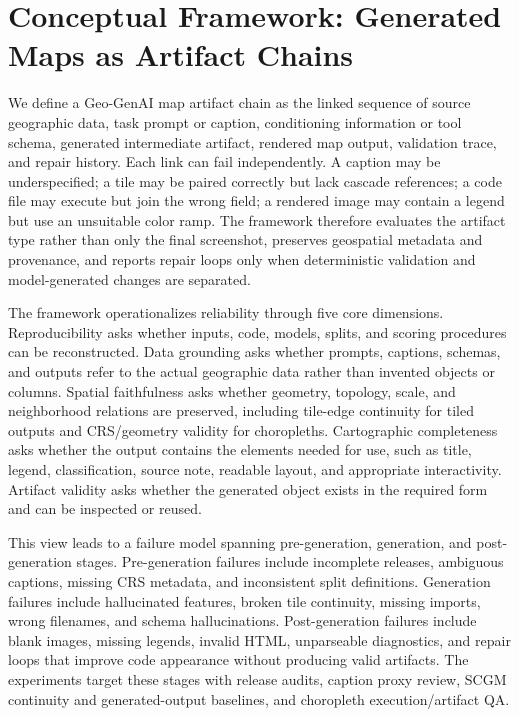 \documentclass[]{interact}
\begin{document}
\section{Conceptual Framework: Generated Maps as Artifact Chains}

We define a Geo-GenAI map artifact chain as the linked sequence of source geographic data, task prompt or caption, conditioning information or tool schema, generated intermediate artifact, rendered map output, validation trace, and repair history. Each link can fail independently. A caption may be underspecified; a tile may be paired correctly but lack cascade references; a code file may execute but join the wrong field; a rendered image may contain a legend but use an unsuitable color ramp. The framework therefore evaluates the artifact type rather than only the final screenshot, preserves geospatial metadata and provenance, and reports repair loops only when deterministic validation and model-generated changes are separated.

The framework operationalizes reliability through five core dimensions. Reproducibility asks whether inputs, code, models, splits, and scoring procedures can be reconstructed. Data grounding asks whether prompts, captions, schemas, and outputs refer to the actual geographic data rather than invented objects or columns. Spatial faithfulness asks whether geometry, topology, scale, and neighborhood relations are preserved, including tile-edge continuity for tiled outputs and CRS/geometry validity for choropleths. Cartographic completeness asks whether the output contains the elements needed for use, such as title, legend, classification, source note, readable layout, and appropriate interactivity. Artifact validity asks whether the generated object exists in the required form and can be inspected or reused.

This view leads to a failure model spanning pre-generation, generation, and post-generation stages. Pre-generation failures include incomplete releases, ambiguous captions, missing CRS metadata, and inconsistent split definitions. Generation failures include hallucinated features, broken tile continuity, missing imports, wrong filenames, and schema hallucinations. Post-generation failures include blank images, missing legends, invalid HTML, unparseable diagnostics, and repair loops that improve code appearance without producing valid artifacts. The experiments target these stages with release audits, caption proxy review, SCGM continuity and generated-output baselines, and choropleth execution/artifact QA.
\end{document}
